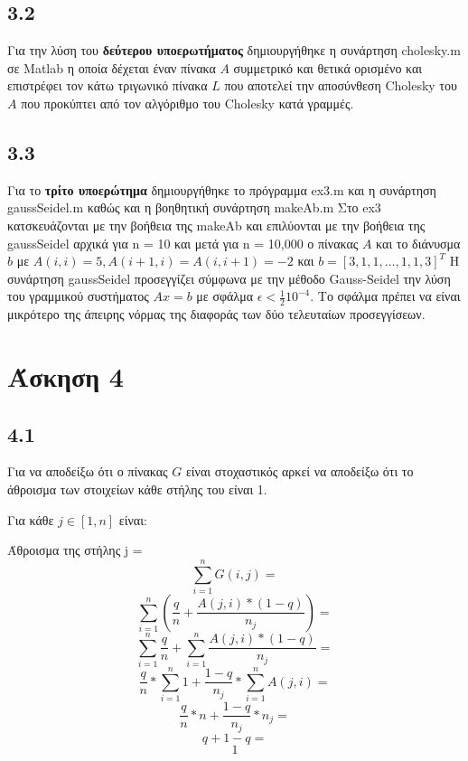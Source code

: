 \documentclass[a4paper,11pt]{article}
\begin{document}
\begin{flushleft}
\subsection*{3.2}
Για την λύση του \textbf{δεύτερου υποερωτήματος} δημιουργήθηκε η συνάρτηση cholesky.m σε Matlab η οποία δέχεται έναν πίνακα $A$ συμμετρικό και θετικά ορισμένο και επιστρέφει τον κάτω τριγωνικό πίνακα $L$ που αποτελεί την αποσύνθεση Cholesky του $A$ που προκύπτει από τον αλγόριθμο του Cholesky κατά γραμμές.
\linebreak

\subsection*{3.3}
Για το \textbf{τρίτο υποερώτημα} δημιουργήθηκε το πρόγραμμα ex3.m και η συνάρτηση gaussSeidel.m καθώς και η βοηθητική συνάρτηση makeAb.m
\linebreak
Στο ex3 κατσκευάζονται με την βοήθεια της makeAb και επιλύονται με την βοήθεια της gaussSeidel αρχικά για n = 10 και μετά για n = 10,000 ο πίνακας $A$ και το διάνυσμα $b$ με $A(i,i) = 5, A(i+1,i) = A(i,i+1) = -2$ και $b = [3,1,1,\dots,1,1,3]^T$
\linebreak
Η συνάρτηση gaussSeidel προσεγγίζει σύμφωνα με την μέθοδο Gauss-Seidel την λύση του γραμμικού συστήματος $Ax=b$ με σφάλμα $\epsilon < \frac{1}{2}10^{-4}$.
Το σφάλμα πρέπει να είναι μικρότερο της άπειρης νόρμας της διαφοράς των δύο τελευταίων προσεγγίσεων.
\pagebreak

\section*{Άσκηση 4}

\subsection*{4.1}
Για να αποδείξω ότι ο πίνακας $G$ είναι στοχαστικός αρκεί να αποδείξω ότι το άθροισμα των στοιχείων κάθε στήλης του είναι 1.

Για κάθε $j\in [1,n]$ είναι:
\begin{center}
    Άθροισμα της στήλης j = $$\sum_{i=1}^nG(i,j)=$$ 
    $$\sum_{i=1}^n(\frac{q}{n}+\frac{A(j,i)*(1-q)}{n_j})=$$
    $$\sum_{i=1}^n\frac{q}{n}+\sum_{i=1}^n\frac{A(j,i)*(1-q)}{n_j}=$$
    $$\frac{q}{n}*\sum_{i=1}^n1+\frac{1-q}{n_j}*\sum_{i=1}^nA(j,i)=$$
    $$\frac{q}{n}*n+\frac{1-q}{n_j}*n_j=$$
    $$q+1-q=$$
    $$1$$
\end{center}


\end{flushleft}
\end{document}
